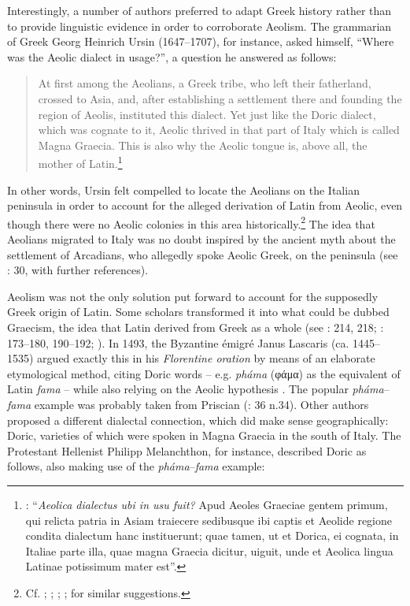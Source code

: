 Interestingly, a number of authors preferred to adapt Greek history rather than to provide linguistic evidence in order to corroborate Aeolism. The grammarian of Greek Georg Heinrich Ursin (1647–1707), for instance, asked himself, “Where was the Aeolic dialect in usage?”, a question he answered as follows:

\begin{quote}
At first among the Aeolians, a Greek tribe, who left their fatherland, crossed to Asia, and, after establishing a settlement there and founding the region of Aeolis, instituted this dialect. Yet just like the Doric dialect, which was cognate to it, Aeolic thrived in that part of Italy which is called Magna Graecia. This is also why the Aeolic tongue is, above all, the mother of Latin.\footnote{\citet[509]{Ursin1691}: “\textit{Aeolica dialectus ubi in usu fuit?} Apud Aeoles Graeciae gentem primum, qui relicta patria in Asiam traiecere sedibusque ibi captis et Aeolide regione condita dialectum hanc instituerunt; quae tamen, ut et Dorica, ei cognata, in Italiae parte illa, quae magna Graecia dicitur, uiguit, unde et Aeolica lingua Latinae potissimum mater est”.}
\end{quote}

In other words, Ursin felt compelled to locate the Aeolians on the Italian peninsula in order to account for the alleged derivation of Latin from Aeolic, even though there were no Aeolic colonies in this area historically.\footnote{Cf. \citet[289]{[schulze]1711}; \citet[\textsc{i}.69]{Ten1723}; \citet[30]{Munthe1748}; \citet[89]{Facius1782}; \citet[199]{Ries1786} for similar suggestions.} The idea that Aeolians migrated to Italy was no doubt inspired by the ancient myth about the settlement of Arcadians, who allegedly spoke Aeolic Greek, on the peninsula (see \citealt{Lamers2019}: 30, with further references).

Aeolism was not the only solution put forward to account for the supposedly Greek origin of Latin. Some scholars transformed it into what could be dubbed Graecism, the idea that Latin derived from Greek as a whole (see \citealt{Tavoni1986}: 214, 218; \citealt{Lamers2015}: 173–180, 190–192; \citeyear{Lamers2019}). In 1493, the Byzantine émigré Janus Lascaris (ca. 1445–1535) argued exactly this in his \textit{Florentine oration} by means of an elaborate etymological method, citing Doric words – e.g. \textit{pháma} (φάμα) as the equivalent of Latin \textit{fama} – while also relying on the Aeolic hypothesis \citep[179]{Lamers2015}. The popular \textit{pháma}–\textit{fama} example was probably taken from Priscian (\citealt{Lamers2019}: 36 n.34). Other authors proposed a different dialectal connection, which did make sense geographically: Doric, varieties of which were spoken in Magna Graecia in the south of Italy. The Protestant Hellenist Philipp Melanchthon, for instance, described Doric as follows, also making use of the \textit{pháma}–\textit{fama} example:

